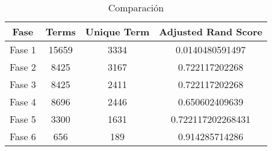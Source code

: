 \documentclass[10pt]{article}
\begin{document}
\begin{table}[htbp]
\begin{center}
\begin{tabular}{|c|c|c|c|}
\hline
Fase&Terms&Unique Term& Adjusted Rand Score\\
\hline \hline
Fase 1&15659&3334&0.0140480591497\\ \hline
Fase 2&8425&3167& 0.722117202268\\ \hline
Fase 3&8425&2411& 0.722117202268\\ \hline
Fase 4&8696&2446&0.650602409639\\ \hline
Fase 5&3300&1631&0.722117202268431\\ \hline
Fase 6&656&189&0.914285714286\\ \hline
\end{tabular}
\caption{Comparación}
\label{tabla:sencilla}
\end{center}
\end{table}
\end{document}
